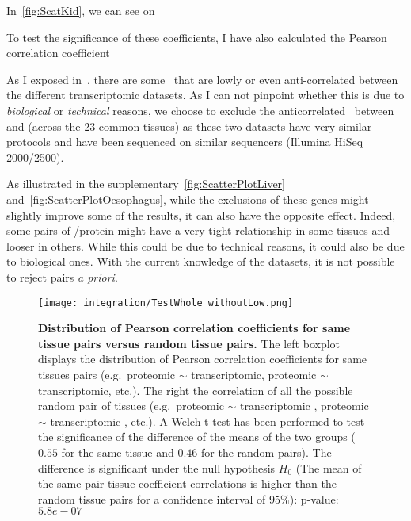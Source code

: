 In~\cref{fig:ScatKid}, we can see on %

To test the significance of these coefficients, I have also calculated the Pearson
correlation coefficient

As I exposed in~, there are some
\mRNAs\ that are lowly or even anti-correlated between the different
transcriptomic datasets.
As I can not pinpoint whether this is due to \emph{biological} or \emph{technical}
reasons, we choose to exclude the anticorrelated \mRNAs\ between  and  (across the 23 common tissues) as these two datasets have
very similar protocols and have been sequenced on similar sequencers (Illumina
HiSeq 2000/2500).

As illustrated in the supplementary~\cref{fig:ScatterPlotLiver}
and~\cref{fig:ScatterPlotOesophagus}, while the exclusions of these genes might
slightly improve some of the results, it can also have the opposite effect.
Indeed, some pairs of \mRNA/protein might have a very tight relationship in some
tissues and looser in others. While this could be due to technical reasons, it
could also be due to biological ones. With the current knowledge of the datasets,
it is not possible to reject pairs \emph{a priori}.



\begin{figure}
    \texttt{[image: integration/TestWhole\_withoutLow.png]}\centering
    \caption[Distribution of Pearson correlation coefficients for same tissue
    pairs versus random tissue pairs]{\label{fig:TestSig}\textbf{Distribution of
    Pearson correlation coefficients for same tissue pairs versus random tissue
    pairs.} The left boxplot displays the distribution of Pearson correlation
    coefficients for same tissues pairs (e.g.\ proteomic\textsubscript{}
    $\sim$ transcriptomic\textsubscript{},
    proteomic\textsubscript{} $\sim$
    transcriptomic\textsubscript{}, etc.).
    The right the correlation of all the possible random
    pair of tissues (e.g.\ proteomic  $\sim$ transcriptomic
    , proteomic  $\sim$ transcriptomic ,
    etc.). A Welch t-test has been performed to test the significance of the
    difference of the means of the two groups ($0.55$ for the same tissue and
    $0.46$ for the random pairs). The difference is significant under the null
    hypothesis $H_{0}$ (The mean of the same pair-tissue coefficient correlations
    is higher than the random tissue pairs for a confidence interval of $95\%$):
    p-value: $5.8e-07$}
\end{figure}

